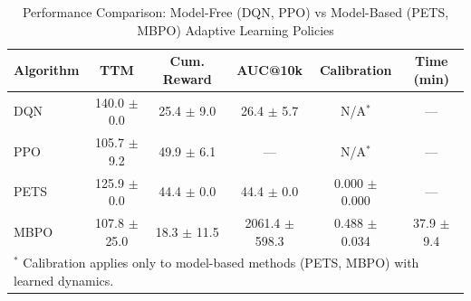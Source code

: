 \begin{table}[htbp]
\centering
\caption{Performance Comparison: Model-Free (DQN, PPO) vs Model-Based (PETS, MBPO) Adaptive Learning Policies}
\label{tab:performance_comparison}
\begin{tabular}{lccccc}
\toprule
\textbf{Algorithm} & \textbf{TTM} & \textbf{Cum. Reward} & \textbf{AUC@10k} & \textbf{Calibration} & \textbf{Time (min)} \\
\midrule
DQN & 140.0 $\pm$ 0.0 & 25.4 $\pm$ 9.0 & 26.4 $\pm$ 5.7 & N/A$^*$ & --- \\
PPO & 105.7 $\pm$ 9.2 & 49.9 $\pm$ 6.1 & --- & N/A$^*$ & --- \\
PETS & 125.9 $\pm$ 0.0 & 44.4 $\pm$ 0.0 & 44.4 $\pm$ 0.0 & 0.000 $\pm$ 0.000 & --- \\
MBPO & 107.8 $\pm$ 25.0 & 18.3 $\pm$ 11.5 & 2061.4 $\pm$ 598.3 & 0.488 $\pm$ 0.034 & 37.9 $\pm$ 9.4 \\
\bottomrule
\multicolumn{6}{l}{$^*$ Calibration applies only to model-based methods (PETS, MBPO) with learned dynamics.} \\
\end{tabular}
\end{table}